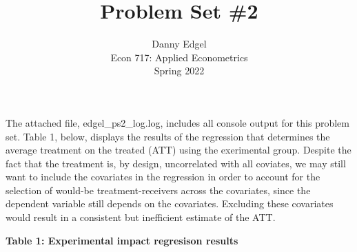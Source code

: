\documentclass{article}
\begin{document}
\title{	Problem Set \#2 }
\author{ 	Danny Edgel 			\\ 
		Econ 717: Applied Econometrics	\\
		Spring 2022						
		}
\maketitle\thispagestyle{empty}


\noindent The attached file, edgel\_ps2\_log.log, includes all console output for this problem set. Table 1, below, displays the results of the regression that determines the average treatment on the treated (ATT) using the exerimental group. Despite the fact that the treatment is, by design, uncorrelated with all coviates, we may still want to include the covariates in the regression in order to account for the selection of would-be treatment-receivers across the covariates, since the dependent variable still depends on the covariates. Excluding these covariates would result in a consistent but inefficient estimate of the ATT.
\pagebreak
\begin{center}
        \textbf{Table 1: Experimental impact regresison results} \\
        
\end{center} 
\end{document}
